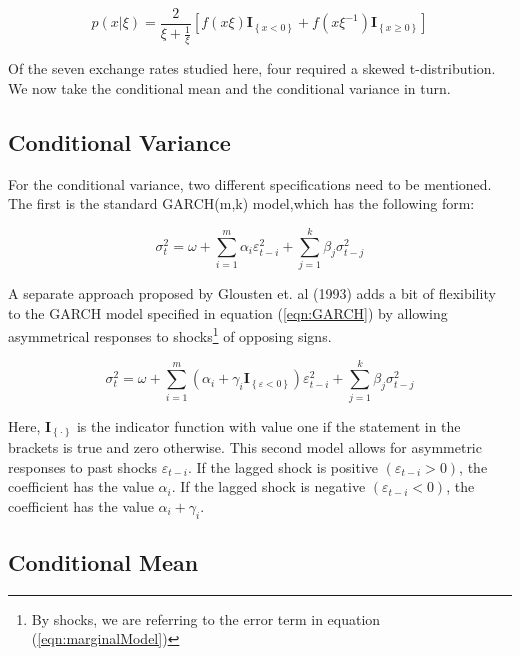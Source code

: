 \documentclass[12pt]{article}
\begin{document}
\begin{equation}
p\left(x|\xi \right) = \frac{2}{\xi + \frac{1}{\xi}} \left[f\left(x\xi\right) \mathbf{I}_{\left\{x < 0\right\}} + f\left(x\xi^{-1}\right) \mathbf{I}_{\left\{x \geq 0\right\}}\right]
\end{equation}

Of the seven exchange rates studied here, four required a skewed t-distribution. We now take the conditional mean and the conditional variance in turn. 

\subsection{Conditional Variance}

For the conditional variance, two different specifications need to be mentioned. The first is the standard GARCH(m,k) model,which has the following form:

\begin{equation} \label{eqn:GARCH}
\sigma_{t}^{2} = \omega + \sum_{i = 1}^{m}\alpha_{i} \varepsilon_{t - i}^{2} + \sum_{j = 1}^{k}\beta_{j} \sigma_{t - j}^{2}
\end{equation}

A separate approach proposed by Glousten et. al (1993) adds a bit of flexibility to the GARCH model specified in equation (\ref{eqn:GARCH}) by allowing asymmetrical responses to shocks\footnote{By shocks, we are referring to the error term in equation (\ref{eqn:marginalModel})} of opposing signs. 

\begin{equation}
\sigma_{t}^{2} = \omega + \sum_{i = 1}^{m}\left(\alpha_{i} + \gamma_{i}\mathbf{I}_{\left\{\varepsilon < 0 \right\}}\right) \varepsilon_{t - i}^{2} + \sum_{j = 1}^{k}\beta_{j}\sigma_{t- j}^{2}
\end{equation}

Here, $\mathbf{I}_{\left\{ \cdot \right\}}$ is the indicator function with value one if the statement in the brackets is true and zero otherwise. This second model allows for asymmetric responses to past shocks $\varepsilon_{t-i}$. If the lagged shock is positive $\left(\varepsilon_{t-i}>0\right)$, the coefficient has the value $\alpha_{i}$. If the lagged shock is negative $\left(\varepsilon_{t-i} < 0 \right)$, the coefficient has the value $\alpha_{i} + \gamma_{i}$.

\subsection{Conditional Mean}
\end{document}
